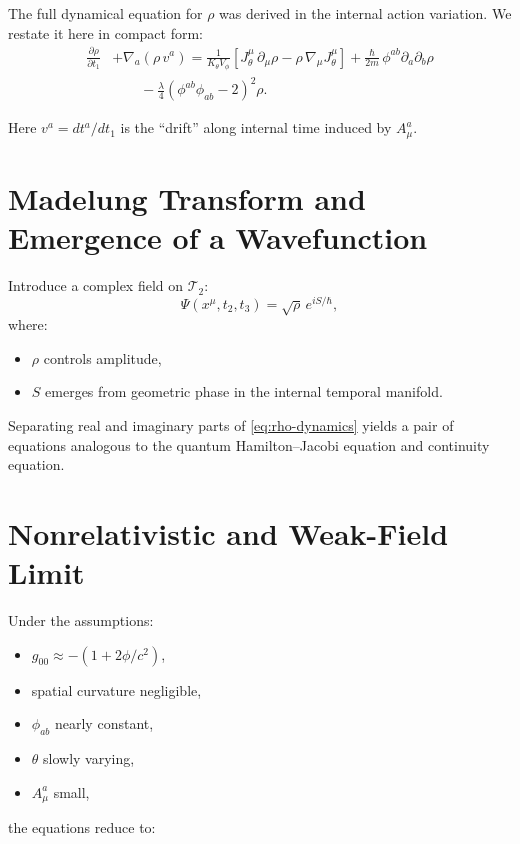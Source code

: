 \documentclass[12pt]{article}
\begin{document}
The full dynamical equation for \(\rho\) was derived in the internal action
variation. We restate it here in compact form:
\begin{align}
\frac{\partial\rho}{\partial t_1}
&+
\nabla_a(\rho\, v^a)
=
\frac{1}{K_\theta V_\phi}
\left[
J^\mu_\theta\,\partial_\mu\rho
-
\rho\,\nabla_\mu J^\mu_\theta
\right]
+ \frac{\hbar}{2m}\,\phi^{ab}\partial_a\partial_b\rho
\nonumber\\
&\qquad
- \frac{\lambda}{4}\left(\phi^{ab}\phi_{ab} - 2\right)^2\rho.
\label{eq:rho-dynamics}
\end{align}

Here \(v^a = dt^a/dt_1\) is the “drift” along internal time induced by \(A^a_\mu\).


\newpage
\section{Madelung Transform and Emergence of a Wavefunction}

Introduce a complex field on \(\mathcal{T}_2\):
\begin{equation}
\Psi(x^\mu,t_2,t_3)
=
\sqrt{\rho}\,e^{iS/\hbar},
\end{equation}
where:
\begin{itemize}
\item \(\rho\) controls amplitude,
\item \(S\) emerges from geometric phase in the internal temporal manifold.
\end{itemize}

Separating real and imaginary parts of \eqref{eq:rho-dynamics} yields
a pair of equations analogous to the quantum Hamilton–Jacobi equation and
continuity equation.


\newpage
\section{Nonrelativistic and Weak-Field Limit}

Under the assumptions:
\begin{itemize}
\item \(g_{00} \approx -(1+2\phi/c^2)\),
\item spatial curvature negligible,
\item \(\phi_{ab}\) nearly constant,
\item \(\theta\) slowly varying,
\item \(A^a_\mu\) small,
\end{itemize}
the equations reduce to:
\end{document}
